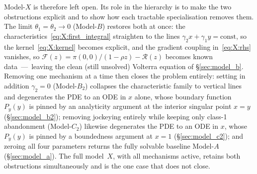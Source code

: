 Model-$X$ is therefore left open. Its role in the hierarchy is to make the
two obstructions explicit and to show how each tractable specialisation removes them. The
limit $\theta_1=\theta_2\to0$ (Model-$B$) restores both at once: the
characteristics~\eqref{eq:X:first_integral} straighten to the lines
$\gamma_2 x+\gamma_1 y=\mathrm{const}$, so the kernel~\eqref{eq:X:kernel} becomes
explicit, and the gradient coupling in~\eqref{eq:X:rhs} vanishes, so
$\mathcal{F}(z)=\pi(0,0)/(1-\rho z)-\mathcal{R}(z)$ becomes known data~---~leaving the
clean (still unsolved) Volterra equation of \S\ref{sec:model_b}. Removing one
mechanism at a time then closes the problem entirely: setting in addition $\gamma_2=0$
(Model-$B_2$) collapses the characteristic family to vertical lines and degenerates the
PDE to an ODE in $x$ alone, whose boundary function $P_y(y)$ is pinned by an analyticity
argument at the interior singular point $x=y$ (\S\ref{sec:model_b2}); removing
jockeying entirely while keeping only class-1 abandonment (Model-$C_2$) likewise
degenerates the PDE to an ODE in $x$, whose $P_y(y)$ is pinned by a boundedness argument
at $x=1$ (\S\ref{sec:model_c2}); and zeroing all four parameters returns the fully
solvable baseline Model-$A$ (\S\ref{sec:model_a}). The full model~$X$, with
all mechanisms active, retains both obstructions simultaneously and is the one case that does
not close.
